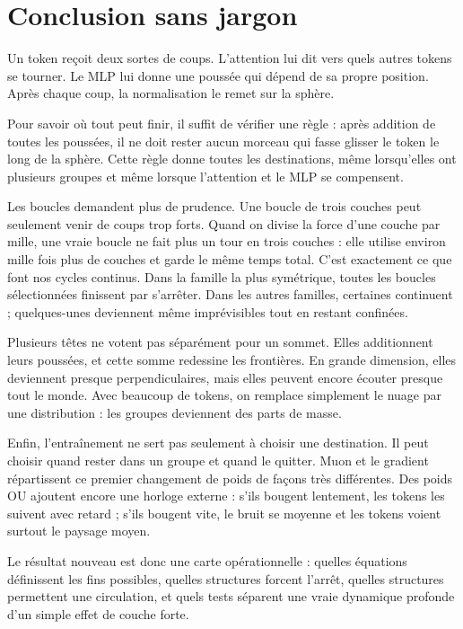 \documentclass[11pt,a4paper]{article}
\theoremstyle{definition}
\begin{document}
\section{Conclusion sans jargon}

Un token reçoit deux sortes de coups. L'attention lui dit vers quels autres tokens se
tourner. Le MLP lui donne une poussée qui dépend de sa propre position. Après chaque
coup, la normalisation le remet sur la sphère.

Pour savoir où tout peut finir, il suffit de vérifier une règle : après addition de
toutes les poussées, il ne doit rester aucun morceau qui fasse glisser le token le long
de la sphère. Cette règle donne toutes les destinations, même lorsqu'elles ont plusieurs
groupes et même lorsque l'attention et le MLP se compensent.

Les boucles demandent plus de prudence. Une boucle de trois couches peut seulement venir
de coups trop forts. Quand on divise la force d'une couche par mille, une vraie boucle
ne fait plus un tour en trois couches : elle utilise environ mille fois plus de couches
et garde le même temps total. C'est exactement ce que font nos cycles continus. Dans la
famille la plus symétrique, toutes les boucles sélectionnées finissent par s'arrêter.
Dans les autres familles, certaines continuent ; quelques-unes deviennent même
imprévisibles tout en restant confinées.

Plusieurs têtes ne votent pas séparément pour un sommet. Elles additionnent leurs
poussées, et cette somme redessine les frontières. En grande dimension, elles deviennent
presque perpendiculaires, mais elles peuvent encore écouter presque tout le monde. Avec
beaucoup de tokens, on remplace simplement le nuage par une distribution : les groupes
deviennent des parts de masse.

Enfin, l'entraînement ne sert pas seulement à choisir une destination. Il peut choisir
quand rester dans un groupe et quand le quitter. Muon et le gradient répartissent ce
premier changement de poids de façons très différentes. Des poids OU ajoutent encore
une horloge externe : s'ils bougent lentement, les tokens les suivent avec retard ;
s'ils bougent vite, le bruit se moyenne et les tokens voient surtout le paysage moyen.

Le résultat nouveau est donc une carte opérationnelle : quelles équations définissent
les fins possibles, quelles structures forcent l'arrêt, quelles structures permettent
une circulation, et quels tests séparent une vraie dynamique profonde d'un simple effet
de couche forte.
\end{document}
